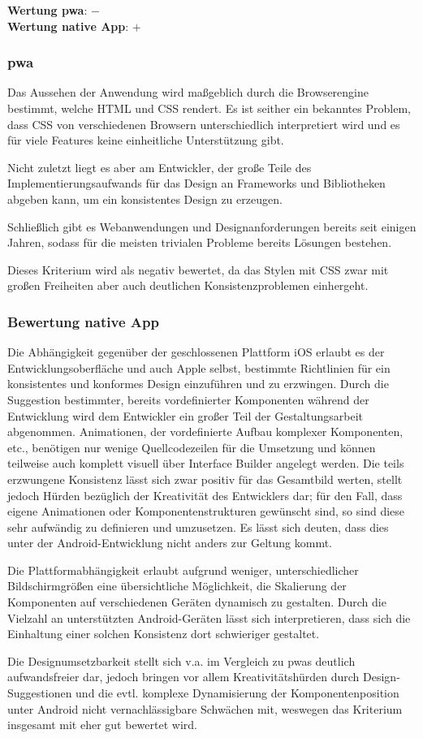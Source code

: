 \textbf{Wertung \ac{pwa}}: $-$\\
\textbf{Wertung native App}: $+$ \\

\subsubsection{\ac{pwa}}
Das Aussehen der Anwendung wird maßgeblich durch die Browserengine bestimmt, welche HTML und CSS rendert. Es ist seither ein bekanntes Problem, dass CSS von verschiedenen Browsern unterschiedlich interpretiert wird und es für viele Features keine einheitliche Unterstützung gibt.

Nicht zuletzt liegt es aber am Entwickler, der große Teile des Implementierungsaufwands für das Design an Frameworks und Bibliotheken abgeben kann, um ein konsistentes Design zu erzeugen. 

Schließlich gibt es Webanwendungen und Designanforderungen bereits seit einigen Jahren, sodass für die meisten trivialen Probleme bereits Lösungen bestehen.

Dieses Kriterium wird als negativ bewertet, da das Stylen mit CSS zwar mit großen Freiheiten aber auch deutlichen Konsistenzproblemen einhergeht.

\subsubsection{Bewertung native App}
Die Abhängigkeit gegenüber der geschlossenen Plattform iOS erlaubt es der Entwicklungsoberfläche und auch Apple selbst, bestimmte Richtlinien für ein konsistentes und konformes Design einzuführen und zu erzwingen. Durch die Suggestion bestimmter, bereits vordefinierter Komponenten während der Entwicklung wird dem Entwickler ein großer Teil der Gestaltungsarbeit abgenommen. Animationen, der vordefinierte Aufbau komplexer Komponenten, etc., benötigen nur wenige Quellcodezeilen für die Umsetzung und können teilweise auch komplett visuell über Interface Builder angelegt werden. Die teils erzwungene Konsistenz lässt sich zwar positiv für das Gesamtbild werten, stellt jedoch Hürden bezüglich der Kreativität des Entwicklers dar; für den Fall, dass eigene Animationen oder Komponentenstrukturen gewünscht sind, so sind diese sehr aufwändig zu definieren und umzusetzen. Es lässt sich deuten, dass dies unter der Android-Entwicklung nicht anders zur Geltung kommt.

Die Plattformabhängigkeit erlaubt aufgrund weniger, unterschiedlicher Bildschirmgrößen eine übersichtliche Möglichkeit, die Skalierung der Komponenten auf verschiedenen Geräten dynamisch zu gestalten. Durch die Vielzahl an unterstützten Android-Geräten lässt sich interpretieren, dass sich die Einhaltung einer solchen Konsistenz dort schwieriger gestaltet.

Die Designumsetzbarkeit stellt sich v.a. im Vergleich zu \acp{pwa} deutlich aufwandsfreier dar, jedoch bringen vor allem Kreativitätshürden durch Design-Suggestionen und die evtl. komplexe Dynamisierung der Komponentenposition unter Android nicht vernachlässigbare Schwächen mit, weswegen das Kriterium insgesamt mit eher gut bewertet wird.